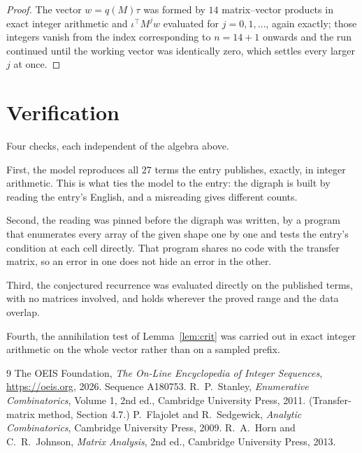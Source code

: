 \documentclass[11pt,a4paper]{article}
\theoremstyle{plain}
\theoremstyle{definition}
\begin{document}
\begin{proof}
The vector $w=q(M)\tau$ was formed by $14$ matrix--vector products in exact integer
arithmetic and $\iota^{\!\top}M^{j}w$ evaluated for $j=0,1,\dots$, again exactly; those
integers vanish from the index corresponding to $n=14+1$ onwards and the run continued
until the working vector was identically zero, which settles every larger $j$ at once.
\end{proof}

\section{Verification}

Four checks, each independent of the algebra above.

First, the model reproduces all $27$ terms the entry publishes, exactly, in integer
arithmetic. This is what ties the model to the entry: the digraph is built by reading the
entry's English, and a misreading gives different counts.

Second, the reading was pinned before the digraph was written, by a program that enumerates
every array of the given shape one by one and tests the entry's condition at each cell
directly. That program shares no code with the transfer matrix, so an error in one does not
hide an error in the other.

Third, the conjectured recurrence was evaluated directly on the published terms, with no
matrices involved, and holds wherever the proved range and the data overlap.

Fourth, the annihilation test of Lemma~\ref{lem:crit} was carried out in exact integer
arithmetic on the whole vector rather than on a sampled prefix.

\begin{thebibliography}{9}
 The OEIS Foundation, \emph{The On-Line Encyclopedia of Integer
Sequences}, \url{https://oeis.org}, 2026. Sequence A180753.
 R.~P.~Stanley, \emph{Enumerative Combinatorics}, Volume 1, 2nd ed.,
Cambridge University Press, 2011. (Transfer-matrix method, Section 4.7.)
 P.~Flajolet and R.~Sedgewick, \emph{Analytic Combinatorics}, Cambridge
University Press, 2009.
 R.~A.~Horn and C.~R.~Johnson, \emph{Matrix Analysis}, 2nd ed., Cambridge
University Press, 2013.
\end{thebibliography}
\end{document}
